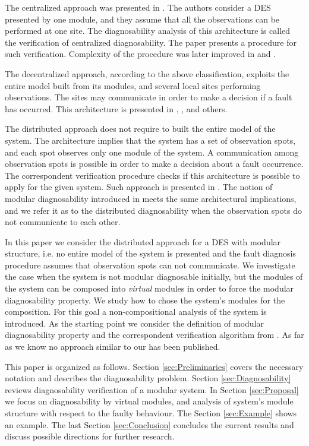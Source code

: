 \documentclass[a4paper, 10pt, conference]{ieeeconf}
\begin{document}
The centralized approach was presented in \cite{sampath_diagnosability_1995}.
The authors consider a DES presented by one module, and they assume that all the
observations can be performed at one site. The diagnosability analysis of this
architecture is called the verification of centralized diagnosability. The paper
presents a procedure for such verification. Complexity of the procedure was
later improved in \cite{jiang_polynomial_2001} and
\cite{yoo_polynomial-time_2002}.

The decentralized approach, according to the above classification, exploits the
entire model built from its modules, and several local sites performing
observations. The sites may communicate in order to make a decision if a fault
has occurred. This architecture is presented in \cite{debouk_coordinated_1998},
\cite{qiu_decentralized_2006}, \cite{wang_diagnosis_2007} and others.

The distributed approach does not require to built the entire model of the
system. The architecture implies that the system has a set of observation spots,
and each spot observes only one module of the system. A communication among
observation spots is possible in order to make a decision about a fault
occurrence. The correspondent verification procedure checks if this architecture
is possible to apply for the given system. Such approach is presented in
\cite{su_distributed_2002}. The notion of modular diagnosability introduced in
\cite{contant_diagnosability_2006} meets the same architectural implications,
and we refer it as to the distributed diagnosability when the observation spots
do not communicate to each other.

In this paper we consider the distributed approach for a DES with modular
structure, i.e. no entire model of the system is presented and the fault
diagnosis procedure assumes that observation spots can not communicate. We
investigate the case when the system is not modular diagnosable initially, but
the modules of the system can be composed into \emph{virtual} modules in order
to force the modular diagnosability property. We study how to chose the system's
modules for the composition. For this goal a non-compositional analysis of the
system is introduced.
As the starting point we consider the definition of modular diagnosability
property and the correspondent verification algorithm from
\cite{contant_diagnosability_2006}. As far as we know no approach similar to our
has been published.

This paper is organized as follows. Section \ref{sec:Preliminaries} covers the
necessary notation and describes the diagnosability problem. Section
\ref{sec:Diagnosability} reviews diagnosability verification of a modular
system. In Section \ref{sec:Proposal} we focus on diagnosability by virtual
modules, and analysis of system's module structure with respect to the faulty
behaviour. The Section \ref{sec:Example} shows an example. The last Section
\ref{sec:Conclusion} concludes the current results and discuss possible
directions for further research.
\end{document}
